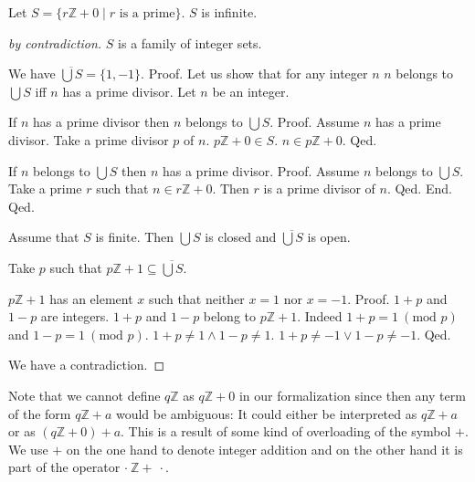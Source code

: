 \documentclass[english]{article}
\renewcommand{\mod}{\text{mod }}
\newcommand{\Int}{\mathbb{Z}}
\begin{document}
  \begin{forthel}
    \begin{theorem}[Fuerstenberg]
      Let $S = \{ r \Int + 0 \mid r \text{ is a prime} \}$.
      $S$ is infinite.
    \end{theorem}
    \begin{proof}[by contradiction]
      $S$ is a family of integer sets.

      We have $\overline{\bigcup S} = \{ 1, -1 \}$. \newline
      Proof.
        Let us show that for any integer $n$ $n$ belongs to $\bigcup S$ iff $n$ has a prime divisor.
          Let $n$ be an integer.

          If $n$ has a prime divisor then $n$ belongs to $\bigcup S$. \newline
          Proof.
            Assume $n$ has a prime divisor.
            Take a prime divisor $p$ of $n$.
            $p \Int + 0 \in S$.
            $n \in p \Int + 0$.
          Qed.

          If $n$ belongs to $\bigcup S$ then $n$ has a prime divisor. \newline
          Proof.
            Assume $n$ belongs to $\bigcup S$.
            Take a prime $r$ such that $n \in r \Int + 0$.
            Then $r$ is a prime divisor of $n$.
          Qed.
        End.
      Qed.

      Assume that $S$ is finite.
      Then $\bigcup S$ is closed and $\overline{\bigcup S}$ is open.

      Take $p$ such that $p \Int + 1 \subseteq \overline{\bigcup S}$.

      $p \Int + 1$ has an element $x$ such that neither $x = 1$ nor $x = -1$. \newline
      Proof.
        $1 + p$ and $1 - p$ are integers.
        $1 + p$ and $1 - p$ belong to $p \Int + 1$.
        Indeed $1 + p = 1 ~(\mod p)$ and $1 - p = 1 ~(\mod p)$.
        $1 + p \neq  1 \wedge 1 - p \neq  1$.
        $1 + p \neq -1 \vee 1 - p \neq -1$.
      Qed.

      We have a contradiction.
    \end{proof}
  \end{forthel}

  Note that we cannot define $q \Int$ as $q \Int + 0$ in our formalization since then any term of
  the form $q \Int + a$ would be ambiguous: It could either be interpreted as $q \Int + a$ or as
  $(q \Int + 0) + a$. This is a result of some kind of overloading of the symbol $+$. We use $+$ on
  the one hand to denote integer addition and on the other hand it is part of the operator
  $\cdot ~ \Int + ~ \cdot$.
\end{document}
